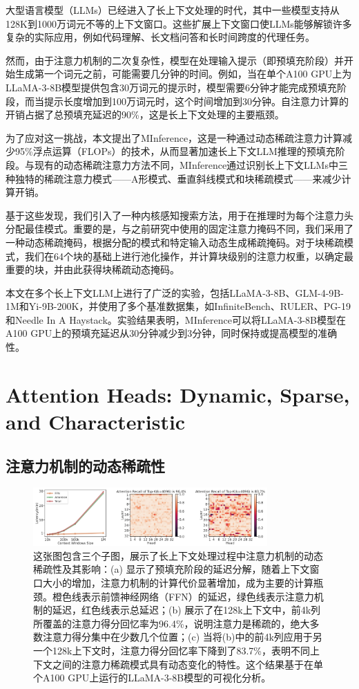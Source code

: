 \documentclass[twocolumn, 10pt]{article} %
\theoremstyle{remark}
\begin{document}
大型语言模型（LLMs）已经进入了长上下文处理的时代，其中一些模型支持从128K到1000万词元不等的上下文窗口。这些扩展上下文窗口使LLMs能够解锁许多复杂的实际应用，例如代码理解、长文档问答和长时间跨度的代理任务。

然而，由于注意力机制的二次复杂性，模型在处理输入提示（即预填充阶段）并开始生成第一个词元之前，可能需要几分钟的时间。例如，当在单个A100 GPU上为LLaMA-3-8B模型提供包含30万词元的提示时，模型需要6分钟才能完成预填充阶段，而当提示长度增加到100万词元时，这个时间增加到30分钟。自注意力计算的开销占据了总预填充延迟的90\%，这是长上下文处理的主要瓶颈。

为了应对这一挑战，本文提出了MInference，这是一种通过动态稀疏注意力计算减少95\%浮点运算（FLOPs）的技术，从而显著加速长上下文LLM推理的预填充阶段。与现有的动态稀疏注意力方法不同，MInference通过识别长上下文LLMs中三种独特的稀疏注意力模式——A形模式、垂直斜线模式和块稀疏模式——来减少计算开销。

基于这些发现，我们引入了一种内核感知搜索方法，用于在推理时为每个注意力头分配最佳模式。重要的是，与之前研究中使用的固定注意力掩码不同，我们采用了一种动态稀疏掩码，根据分配的模式和特定输入动态生成稀疏掩码。对于块稀疏模式，我们在64个块的基础上进行池化操作，并计算块级别的注意力权重，以确定最重要的块，并由此获得块稀疏动态掩码。

本文在多个长上下文LLM上进行了广泛的实验，包括LLaMA-3-8B、GLM-4-9B-1M和Yi-9B-200K，并使用了多个基准数据集，如InfiniteBench、RULER、PG-19和Needle In A Haystack。实验结果表明，MInference可以将LLaMA-3-8B模型在A100 GPU上的预填充延迟从30分钟减少到3分钟，同时保持或提高模型的准确性。


\section{Attention Heads: Dynamic, Sparse, and Characteristic}

\subsection{注意力机制的动态稀疏性}
\begin{figure}[ht]
    \centering
    \includegraphics[width=0.8\textwidth]{m_latency_breakdown.png}
    \caption{
        这张图包含三个子图，展示了长上下文处理过程中注意力机制的动态稀疏性及其影响：(a) 显示了预填充阶段的延迟分解，随着上下文窗口大小的增加，注意力机制的计算代价显著增加，成为主要的计算瓶颈。橙色线表示前馈神经网络（FFN）的延迟，绿色线表示注意力机制的延迟，红色线表示总延迟；(b) 展示了在128k上下文中，前4k列所覆盖的注意力得分回忆率为96.4\%，说明注意力是稀疏的，绝大多数注意力得分集中在少数几个位置；(c) 当将(b)中的前4k列应用于另一个128k上下文时，注意力得分回忆率下降到了83.7\%，表明不同上下文之间的注意力稀疏模式具有动态变化的特性。这个结果基于在单个A100 GPU上运行的LLaMA-3-8B模型的可视化分析。
    }
\end{figure}
\end{document}
